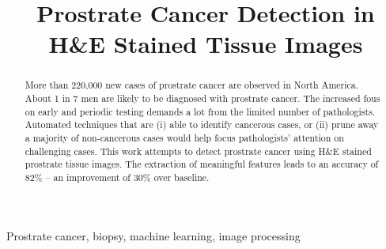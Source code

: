 \documentclass{article}
\title{Prostrate Cancer Detection in H\&E Stained Tissue Images}
\begin{document}
%
\maketitle
%
\begin{abstract}
More than 220,000 new cases of prostrate cancer are observed in North America. About 1 in 7 men are likely to be diagnosed with prostrate cancer. The increased fous on early and periodic testing demands a lot from the limited number of pathologists. Automated techniques that are (i) able to identify cancerous cases, or (ii) prune away a majority of non-cancerous cases would help focus pathologists' attention on challenging cases. This work attempts to detect prostrate cancer using H\&E stained prostrate tissue images. The extraction of meaningful features leads to an accuracy of 82\% -- an improvement of 30\% over baseline.
\end{abstract}
%
\begin{keywords}
Prostrate cancer, biopsy, machine learning, image processing
\end{keywords}
%












\nocite{*}


\end{document}
